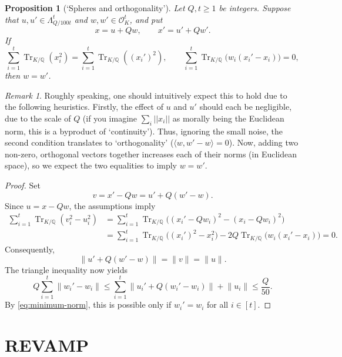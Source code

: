 \documentclass[11pt]{article}
\theoremstyle{plain}
\newtheorem{proposition}[theorem]{Proposition}
\theoremstyle{remark}
\newtheorem{remark}[theorem]{Remark}
\newcommand{\Q}{\mathbb Q}
\newcommand{\OK}{\mathcal O_K}
\newcommand{\Tr}{\operatorname{Tr}_{K/\Q}}
\begin{document}
\begin{proposition}[`Spheres and orthogonality']\label{prop:decoding}
Let $Q,t\geq1$ be integers.  Suppose that
$u,u'\in\Lambda_{Q/100t}^t$ and $w,w'\in\OK^t$, and put
\[
  x=u+Qw,
  \qquad
  x'=u'+Qw'.
\]
If
\[
  \sum_{i=1}^t\Tr(x_i^2)=\sum_{i=1}^t\Tr((x_i')^2),
  \qquad
  \sum_{i=1}^t \Tr\bigl(w_i(x_i'-x_i)\bigr)=0,
\]
then $w=w'$.
\end{proposition}
\begin{remark}
    Roughly speaking, one should intuitively expect this to hold due to the following heuristics. Firstly, the effect of $u$ and $u'$ should each be negligible, due to the scale of $Q$ (if you imagine $\sum_i ||x_i||$ as morally being the Euclidean norm, this is a byproduct of `continuity'). Thus, ignoring the small noise, the second condition translates to `orthogonality' ($\langle w,w'-w\rangle=0$). Now, adding two non-zero, orthogonal vectors together increases each of their norms (in Euclidean space), so we expect the two equalities to imply $w=w'$. 
\end{remark}
\begin{proof}
Set
\[
  v=x'-Qw=u'+Q(w'-w).
\]
Since $u=x-Qw$, the assumptions imply
\begin{align*}
  \sum_{i=1}^t \Tr(v_i^2-u_i^2)
  &=\sum_{i=1}^t\Tr\bigl((x_i'-Qw_i)^2-(x_i-Qw_i)^2\bigr)\\
  &=\sum_{i=1}^t\Tr\bigl((x_i')^2-x_i^2\bigr)
    -2Q\Tr\bigl(w_i(x_i'-x_i)\bigr)=0.
\end{align*}
Consequently,
\[
  \lVert u'+Q(w'-w)\rVert
  =\lVert v\rVert
  =\lVert u\rVert.
\]
The triangle inequality now yields
\[
  Q\sum_{i=1}^t\lVert w_i'-w_i\rVert
  \leq \sum_{i=1}^t\lVert u_i'+Q(w_i'-w_i)\rVert+\lVert u_i\rVert
  \leq \frac{Q}{50}.
\]
By \eqref{eq:minimum-norm}, this is possible only if $w_i'=w_i$ for all $i\in [t]$.
\end{proof}


\section{REVAMP}
\end{document}
